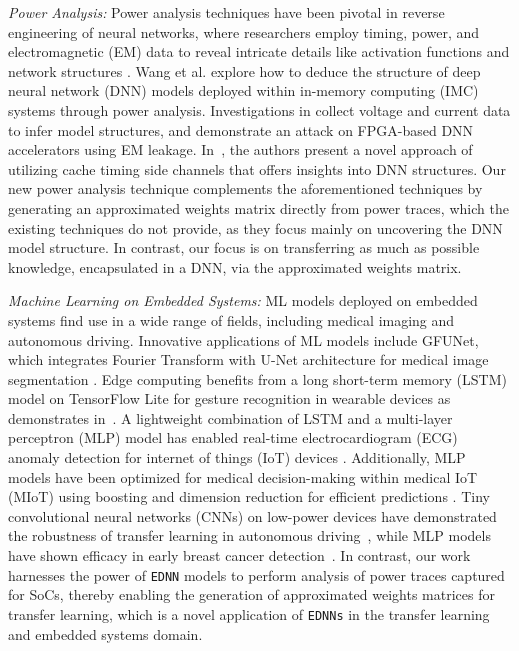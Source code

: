 \documentclass[letterpaper]{article}
\begin{document}
\emph{Power Analysis:}
Power analysis techniques have been pivotal in reverse engineering of neural networks, where researchers employ timing, power, and electromagnetic (EM) data to reveal intricate details like activation functions and network structures \cite{10.5555/3361338.3361374}. Wang et al. \cite{10077551} explore how to deduce the structure of deep neural network (DNN) models deployed within in-memory computing (IMC) systems through power analysis. Investigations in \cite{9000972} collect voltage and current data to infer model structures, and \cite{8735505} demonstrate an attack on FPGA-based DNN accelerators using EM leakage. In~\cite{10.1145/3195970.3196105}, the authors present a novel approach of utilizing cache timing side channels that offers insights into DNN structures. Our new power analysis technique complements the aforementioned techniques by generating an approximated weights matrix directly from power traces, which the existing techniques do not provide, as they focus mainly on uncovering the DNN model structure. In contrast, our focus is on transferring as much as possible knowledge, encapsulated in a DNN, via the approximated weights matrix. 

\emph{Machine Learning on Embedded Systems:}
ML models deployed on embedded systems find use in a wide range of fields, including medical imaging and autonomous driving. Innovative applications of ML models include GFUNet, which integrates Fourier Transform with U-Net architecture for medical image segmentation \cite{LI2023107290}. Edge computing benefits from a long short-term memory (LSTM) model on TensorFlow Lite for gesture recognition in wearable devices as demonstrates in~\cite{9399005}. A lightweight combination of LSTM and a multi-layer perceptron (MLP) model has enabled real-time electrocardiogram (ECG) anomaly detection for internet of things (IoT) devices \cite{9669005}. Additionally, MLP models have been optimized for medical decision-making within medical IoT (MIoT) using boosting and dimension reduction for efficient predictions \cite{LEE202015}. Tiny convolutional neural networks (CNNs) on low-power devices have demonstrated the robustness of transfer learning in autonomous driving~\cite{Rana_2023}, while MLP models have shown efficacy in early breast cancer detection~\cite{Rana_2023}. In contrast, our work harnesses the power of \texttt{EDNN} models to perform analysis of power traces captured for SoCs, thereby enabling the generation of approximated weights matrices for transfer learning, which is a novel application of \texttt{EDNNs} in the transfer learning and embedded systems domain.
\end{document}

